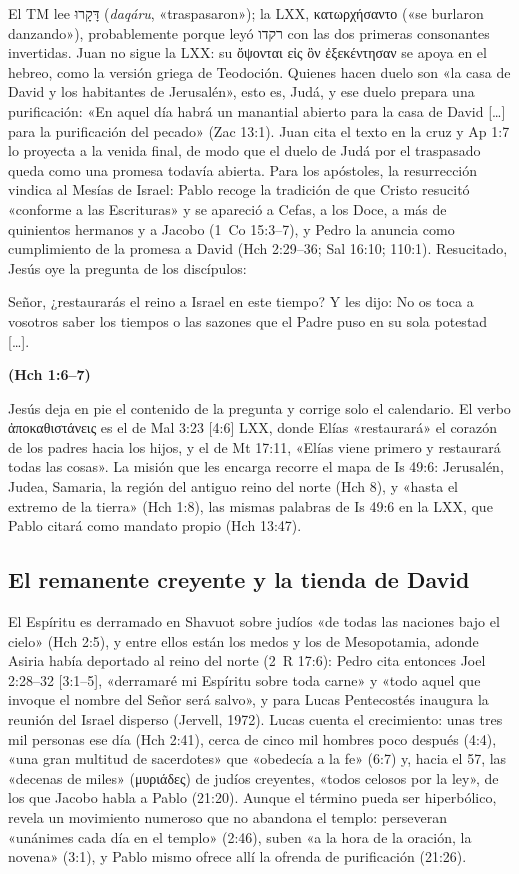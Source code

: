 \documentclass[11pt,letterpaper]{article}
\newcommand{\heb}[1]{\mbox{\foreignlanguage{hebrew}{#1}}}
\newcommand{\grc}[1]{\foreignlanguage{ancientgreek}{#1}}
\newcommand{\fuente}[1]{\par\hfill{\upshape\bfseries\small\textcolor{ladrillo}{#1}}}
\begin{document}
El TM lee \heb{דָּקָרוּ} (\emph{daqáru}, «traspasaron»); la LXX, \grc{κατωρχήσαντο} («se burlaron danzando»), probablemente porque leyó \heb{רקדו} con las dos primeras consonantes invertidas. Juan no sigue la LXX: su \grc{ὄψονται εἰς ὃν ἐξεκέντησαν} se apoya en el hebreo, como la versión griega de Teodoción. Quienes hacen duelo son «la casa de David y los habitantes de Jerusalén», esto es, Judá, y ese duelo prepara una purificación: «En aquel día habrá un manantial abierto para la casa de David [\ldots] para la purificación del pecado» (Zac 13:1). Juan cita el texto en la cruz y Ap 1:7 lo proyecta a la venida final, de modo que el duelo de Judá por el traspasado queda como una promesa todavía abierta. Para los apóstoles, la resurrección vindica al Mesías de Israel: Pablo recoge la tradición de que Cristo resucitó «conforme a las Escrituras» y se apareció a Cefas, a los Doce, a más de quinientos hermanos y a Jacobo (1~Co 15:3--7), y Pedro la anuncia como cumplimiento de la promesa a David (Hch 2:29--36; Sal 16:10; 110:1). Resucitado, Jesús oye la pregunta de los discípulos:

\begin{cita}Señor, ¿restaurarás el reino a Israel en este tiempo? Y les dijo: No os toca a vosotros saber los tiempos o las sazones que el Padre puso en su sola potestad [\ldots].\fuente{(Hch 1:6--7)}\end{cita}

Jesús deja en pie el contenido de la pregunta y corrige solo el calendario. El verbo \grc{ἀποκαθιστάνεις} es el de Mal 3:23 [4:6] LXX, donde Elías «restaurará» el corazón de los padres hacia los hijos, y el de Mt 17:11, «Elías viene primero y restaurará todas las cosas». La misión que les encarga recorre el mapa de Is 49:6: Jerusalén, Judea, Samaria, la región del antiguo reino del norte (Hch 8), y «hasta el extremo de la tierra» (Hch 1:8), las mismas palabras de Is 49:6 en la LXX, que Pablo citará como mandato propio (Hch 13:47).

\subsection{El remanente creyente y la tienda de David}
El Espíritu es derramado en Shavuot sobre judíos «de todas las naciones bajo el cielo» (Hch 2:5), y entre ellos están los medos y los de Mesopotamia, adonde Asiria había deportado al reino del norte (2~R 17:6): Pedro cita entonces Joel 2:28--32 [3:1--5], «derramaré mi Espíritu sobre toda carne» y «todo aquel que invoque el nombre del Señor será salvo», y para Lucas Pentecostés inaugura la reunión del Israel disperso (Jervell, 1972). Lucas cuenta el crecimiento: unas tres mil personas ese día (Hch 2:41), cerca de cinco mil hombres poco después (4:4), «una gran multitud de sacerdotes» que «obedecía a la fe» (6:7) y, hacia el 57, las «decenas de miles» (\grc{μυριάδες}) de judíos creyentes, «todos celosos por la ley», de los que Jacobo habla a Pablo (21:20). Aunque el término pueda ser hiperbólico, revela un movimiento numeroso que no abandona el templo: perseveran «unánimes cada día en el templo» (2:46), suben «a la hora de la oración, la novena» (3:1), y Pablo mismo ofrece allí la ofrenda de purificación (21:26).
\end{document}
